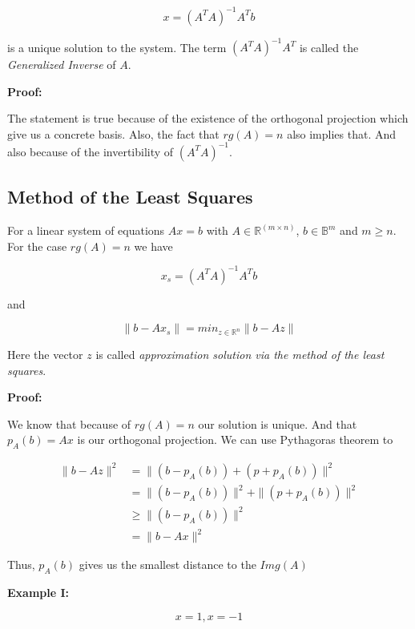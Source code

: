 \[
x = {(A^T A)}^{-1} A^T b
\]

is a unique solution to the system. The term \({(A^T A)}^{-1}A^T\) is called the \emph{Generalized Inverse} of \(A\).
\vspace{\baselineskip}

\textbf{Proof:}

The statement is true because of the existence of the orthogonal projection which give us a concrete basis. Also, 
the fact that \(rg(A) = n\) also implies that. And also because of the invertibility of \({(A^T A)}^{-1}\).

\QED

\subsection{Method of the Least Squares}

For a linear system of equations \(Ax=b\) with \(A \in \mathbb{R}^{(m \times n)}\), 
\(b \in \mathbb{B}^m\) and \(m \ge n\). For the case \(rg(A) = n\) we have

\[
x_s = {(A^T A)}^{-1} A^T b
\]

and 

\[
\| b - Ax_s \| = min_{z \in \mathbb{R}^n} \| b - Az \| 
\]

Here the vector \(z\) is called \emph{approximation solution via the method of the least squares}.
\vspace{\baselineskip}

\textbf{Proof:}

We know that because of \(rg(A) = n\) our solution is unique. And that \(p_A(b) = Ax\) is our orthogonal 
projection. We can use Pythagoras theorem to


\begin{align*}
\| b - Az \|^2 &= \| (b  - p_A (b))  + (p + p_A(b)) \|^2 \\
			   &=  \| (b  - p_A (b))\|^2  +\|(p + p_A(b)) \|^2 \\
  			   &\ge  \| (b  - p_A (b))\|^2 \\
			   &= \| b - Ax \|^2 
\end{align*}

Thus, \(p_A(b)\) gives us the smallest distance to the \(Img(A)\)

\QED
\vspace{\baselineskip}

\textbf{Example I:}
\vspace{\baselineskip}

\[
x = 1, x = -1
\]

